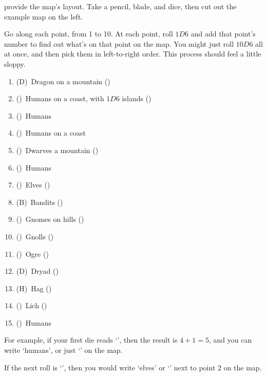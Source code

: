 \begin{multicols}{2}

provide the map's layout.
Take a pencil, blade, and dice, then cut out the example map on the left.

Go along each point, from 1 to 10.
At each point, roll $1D6$ and add that point's number to find out what's on that point on the map.
You might just roll $10D6$ all at once, and then pick them in left-to-right order.
This process should feel a little sloppy.

\begin{multicols}{2}

\begin{enumerate}
  \raggedright
  \setcounter{enumi}{1}
  \item
  (D)~Dragon on a mountain
  ()
  \item
  (\Hu)~Humans on a coast, with $1D6$ islands
  ()
  \item
  (\Hu)~Humans
  \item
  (\Hu)~Humans on a coast
  \item
  (\Dw)~Dwarves a mountain
  ()
  \item
  (\Hu)~Humans
  \item
  (\El)~Elves
  ()
  \item
  (B\Hu)~Bandits
  ()
  \item
  (\Gn)~Gnomes on hills
  ()
  \item
  (\Nl)~Gnolls
  ()
  \item
  (\N)~Ogre
  ()
  \item
  (D\El)~Dryad
  ()
  \item
  (H)~Hag
  ()
  \item
  (\D)~Lich
  ()
  \item
  (\Hu)~Humans
\end{enumerate}

\end{multicols}

\begin{exampletext}
  For example, if your first die reads `', then the result is $4+1 = 5$, and you can write `humans', or just `\Hu' on the map.

  If the next roll is `', then you would write `elves' or `\El' next to point 2 on the map.
\end{exampletext}


\end{multicols}
